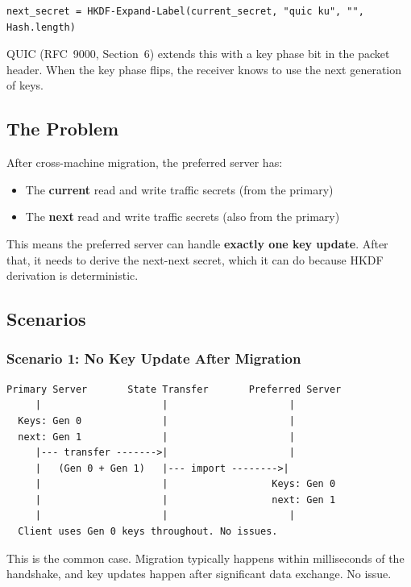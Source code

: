 \documentclass[11pt,a4paper]{article}
\begin{document}
\begin{lstlisting}
next_secret = HKDF-Expand-Label(current_secret, "quic ku", "", Hash.length)
\end{lstlisting}

QUIC (RFC~9000, Section~6) extends this with a key phase bit in the packet header. When the key phase flips, the receiver knows to use the next generation of keys.

\subsection{The Problem}

After cross-machine migration, the preferred server has:
\begin{itemize}
    \item The \textbf{current} read and write traffic secrets (from the primary)
    \item The \textbf{next} read and write traffic secrets (also from the primary)
\end{itemize}

This means the preferred server can handle \textbf{exactly one key update}. After that, it needs to derive the next-next secret, which it can do because HKDF derivation is deterministic.

\subsection{Scenarios}

\subsubsection{Scenario 1: No Key Update After Migration}

\begin{lstlisting}
Primary Server       State Transfer       Preferred Server
     |                     |                     |
  Keys: Gen 0              |                     |
  next: Gen 1              |                     |
     |--- transfer ------->|                     |
     |   (Gen 0 + Gen 1)   |--- import -------->|
     |                     |                  Keys: Gen 0
     |                     |                  next: Gen 1
     |                     |                     |
  Client uses Gen 0 keys throughout. No issues.
\end{lstlisting}

This is the common case. Migration typically happens within milliseconds of the handshake, and key updates happen after significant data exchange. No issue.
\end{document}
